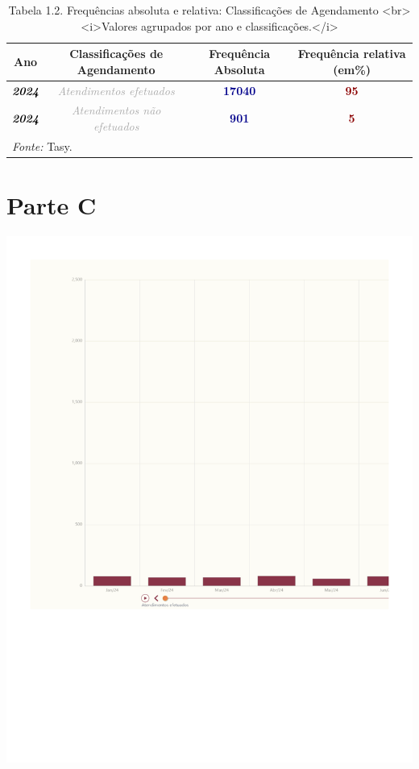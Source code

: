 \documentclass[
  letterpaper,
  DIV=11,
  numbers=noendperiod]{scrreprt}
\begin{document}
\begin{table}
\centering
\caption{Tabela 1.2. Frequências absoluta e relativa: Classificações de Agendamento  <br><i>Valores agrupados por ano e classificações.</i>}
\centering
\begin{tabular}[t]{>{}c|>{}c|>{}c|>{}c}
\hline
Ano & Classificações de Agendamento & Frequência Absoluta & Frequência relativa (em\%)\\
\hline
\textcolor{black}{\em{\textbf{2024}}} & \textcolor{darkgray}{\em{Atendimentos efetuados}} & \textcolor{darkblue}{\textbf{17040}} & \textcolor{darkred}{\textbf{95}}\\
\hline
\textcolor{black}{\em{\textbf{2024}}} & \textcolor{darkgray}{\em{Atendimentos não efetuados}} & \textcolor{darkblue}{\textbf{901}} & \textcolor{darkred}{\textbf{5}}\\
\hline
\multicolumn{4}{l}{\rule{0pt}{1em}\textit{Fonte: } Tasy.}\\
\end{tabular}
\end{table}

\section{Parte C}

\includegraphics{2024_files/figure-pdf/unnamed-chunk-4-1.pdf}
\end{document}
